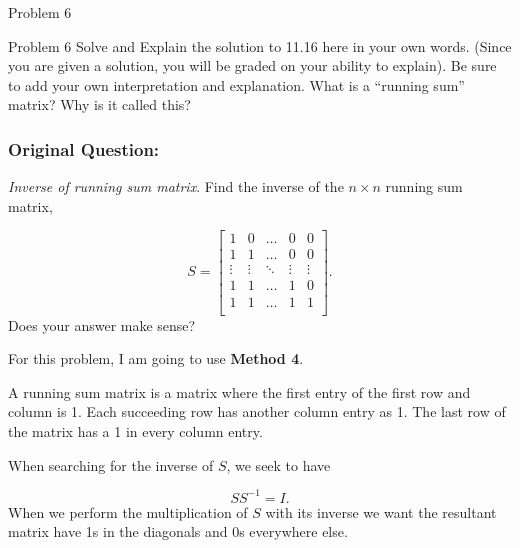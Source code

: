 \begin{problem}{Problem 6}
    \begin{statement}{Problem 6}
        Solve and Explain the solution to 11.16 here in your own words. (Since you are given a solution, you will be graded on your ability to explain). Be sure to add your own interpretation and 
        explanation. What is a “running sum” matrix? Why is it called this?

        \subsubsection*{Original Question:}

        \textit{Inverse of running sum matrix}. Find the inverse of the $n \times n$ running sum matrix,

        \begin{equation*}
            S = 
            \begin{bmatrix}
                1 & 0 & \dots & 0 & 0 \\
                1 & 1 & \dots & 0 & 0 \\
                \vdots & \vdots & \ddots & \vdots & \vdots \\
                1 & 1 & \dots & 1 & 0 \\
                1 & 1 & \dots & 1 & 1 \\
            \end{bmatrix}.
        \end{equation*}
        Does your answer make sense?
    \end{statement}

    \begin{highlight}[Solution]
        \noindent For this problem, I am going to use \textbf{Method 4}. \vspace*{1em}

        A running sum matrix is a matrix where the first entry of the first row and column is 1. Each succeeding row has another column entry as 1. The last row of the matrix has a 1 in every column entry.

        When searching for the inverse of $S$, we seek to have 

        \setcounter{equation}{0}
        \begin{equation}
            SS^{-1} = I.
        \end{equation}
        When we perform the multiplication of $S$ with its inverse we want the resultant matrix have 1s in the diagonals and 0s everywhere else.


\end{highlight}
\end{problem}

